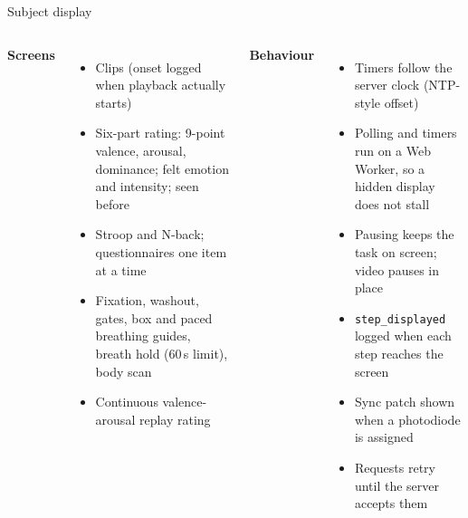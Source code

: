 \documentclass[aspectratio=169,11pt]{beamer}
\newcommand{\code}[1]{{\small\texttt{#1}}}
\begin{document}
\begin{frame}{Subject display}
  \begin{columns}[T]
    \textbf{Screens}
    \begin{itemize}\small
      \item Clips (onset logged when playback actually starts)
      \item Six-part rating: 9-point valence, arousal, dominance; felt emotion and intensity; seen before
      \item Stroop and N-back; questionnaires one item at a time
      \item Fixation, washout, gates, box and paced breathing guides, breath hold (60\,s limit), body scan
      \item Continuous valence-arousal replay rating
    \end{itemize}
    \textbf{Behaviour}
    \begin{itemize}\small
      \item Timers follow the server clock (NTP-style offset)
      \item Polling and timers run on a Web Worker, so a hidden display does not stall
      \item Pausing keeps the task on screen; video pauses in place
      \item \code{step\_displayed} logged when each step reaches the screen
      \item Sync patch shown when a photodiode is assigned
      \item Requests retry until the server accepts them
    \end{itemize}
  \end{columns}
\end{frame}
\end{document}
